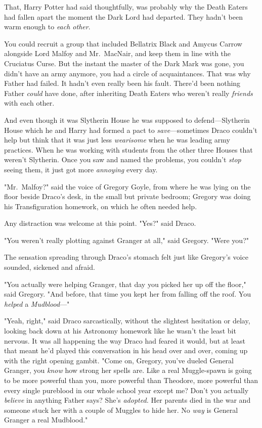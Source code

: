 That, Harry Potter had said thoughtfully, was probably why the Death Eaters had
fallen apart the moment the Dark Lord had departed. They hadn't been warm
enough to \emph{each other}.

You could recruit a group that included Bellatrix Black and Amycus Carrow
alongside Lord Malfoy and Mr.~MacNair, and keep them in line with the Cruciatus
Curse. But the instant the master of the Dark Mark was gone, you didn't have an
army anymore, you had a circle of acquaintances. That was why Father had
failed. It hadn't even really been his fault. There'd been nothing Father
\emph{could} have done, after inheriting Death Eaters who weren't really
\emph{friends} with each other.

And even though it was Slytherin House he was supposed to defend---Slytherin
House which he and Harry had formed a pact to \emph{save}---sometimes Draco
couldn't help but think that it was just less \emph{wearisome} when he was
leading army practices. When he was working with students from the other three
Houses that weren't Slytherin. Once you saw and named the problems, you
couldn't \emph{stop} seeing them, it just got more \emph{annoying} every day.

"Mr.~Malfoy?" said the voice of Gregory Goyle, from where he was lying on the
floor beside Draco's desk, in the small but private bedroom; Gregory was doing
his Transfiguration homework, on which he often needed help.

Any distraction was welcome at this point. "Yes?" said Draco.

"You weren't really plotting against Granger at all," said Gregory. "Were you?"

The sensation spreading through Draco's stomach felt just like Gregory's voice
sounded, sickened and afraid.

"You actually were helping Granger, that day you picked her up off the floor,"
said Gregory. "And before, that time you kept her from falling off the roof.
You \emph{helped} a \emph{Mudblood}---"

"Yeah, right," said Draco sarcastically, without the slightest hesitation or
delay, looking back down at his Astronomy homework like he wasn't the least bit
nervous. It was all happening the way Draco had feared it would, but at least
that meant he'd played this conversation in his head over and over, coming up
with the right opening gambit. "Come on, Gregory, you've dueled General
Granger, you \emph{know} how strong her spells are. Like a real Muggle-spawn is
going to be more powerful than you, more powerful than Theodore, more powerful
than every single pureblood in our whole school year except me? Don't you
actually \emph{believe} in anything Father says? She's \emph{adopted.} Her
parents died in the war and someone stuck her with a couple of Muggles to hide
her. No \emph{way} is General Granger a real Mudblood."

